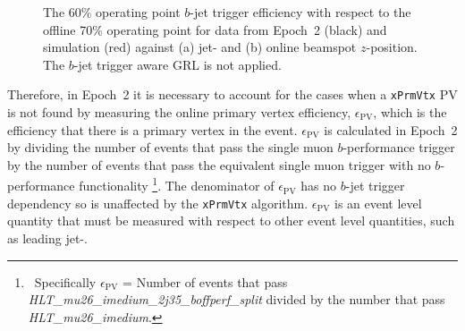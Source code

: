 \begin{figure}[!htb]
\begin{center}
  \captionsetup[subfigure]{aboveskip=0pt,justification=centering}
  \hspace{-0.5cm}
\end{center}
\vspace{-1em}
\caption[
  The $b$-jet trigger efficiency 
  for data from Epoch~2 and simulation against jet-\pT{} and online beamspot $z$-position.
  The $b$-jet trigger aware GRL is not applied.]
        {
  The 60\% operating point $b$-jet trigger efficiency with respect to the offline 70\% operating point
  for data from Epoch~2 (black) and simulation (red) against (a) jet-\pT{} and (b) online beamspot $z$-position.
  The $b$-jet trigger aware GRL is not applied.}
\label{fig:Epoch2_eff}
\end{figure}

Therefore, in Epoch~2 it is necessary to account for the cases when a \verb|xPrmVtx| PV is not found
by measuring the online primary vertex efficiency, $\epsilon_{\text{PV}}$,
which is the efficiency that there is a primary vertex in the event.
$\epsilon_{\text{PV}}$ is calculated in Epoch~2 by dividing the number of events that pass the single muon $b$-performance trigger
by the number of events that pass the equivalent single muon trigger with no $b$-performance functionality
\footnote{\ Specifically $\epsilon_{\text{PV}}$ = Number of events that pass \textit{HLT\_mu26\_imedium\_2j35\_boffperf\_split} divided by the number that pass \textit{HLT\_mu26\_imedium}.}.
The denominator of $\epsilon_{\text{PV}}$ has no $b$-jet trigger dependency so is unaffected by the \verb|xPrmVtx| algorithm.
$\epsilon_{\text{PV}}$ is an event level quantity that must be measured with respect to other event level quantities, such as leading jet-\pT.

